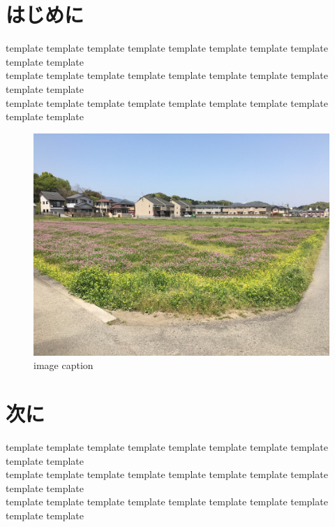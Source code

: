 \documentclass{jarticle}
\begin{document}
\maketitle

\section{はじめに}
  template template template template template template template template template template \\
  template template template template template template template template template template \\
  template template template template template template template template template template
  \begin{figure}[htbp]
    \begin{center}
      \includegraphics[width=0.9\linewidth]{images/template.jpg}
      \vspace*{-0.3cm}
      \caption{image caption}
      \label{fig:template}
    \end{center}
  \end{figure}


\section{次に}
template template template template template template template template template template \\
template template template template template template template template template template \\
template template template template template template template template template template
\end{document}
